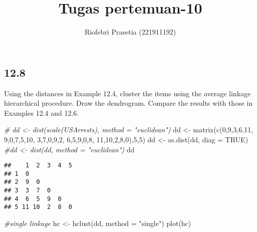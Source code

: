 \documentclass[
]{article}
\title{Tugas pertemuan-10}
\author{Riofebri Prasetia (221911192)}
\date{}
\newenvironment{Shaded}{\begin{snugshade}}{\end{snugshade}}
\newcommand{\AttributeTok}[1]{\textcolor[rgb]{0.77,0.63,0.00}{#1}}
\newcommand{\CommentTok}[1]{\textcolor[rgb]{0.56,0.35,0.01}{\textit{#1}}}
\newcommand{\ConstantTok}[1]{\textcolor[rgb]{0.00,0.00,0.00}{#1}}
\newcommand{\DecValTok}[1]{\textcolor[rgb]{0.00,0.00,0.81}{#1}}
\newcommand{\FunctionTok}[1]{\textcolor[rgb]{0.00,0.00,0.00}{#1}}
\newcommand{\NormalTok}[1]{#1}
\newcommand{\OtherTok}[1]{\textcolor[rgb]{0.56,0.35,0.01}{#1}}
\newcommand{\StringTok}[1]{\textcolor[rgb]{0.31,0.60,0.02}{#1}}
\begin{document}
\maketitle

\hypertarget{section}{%
\subsection{12.8}\label{section}}

Using the distances in Example 12.4, cluster the items using the average
linkage hierarchical procedure. Draw the dendrogram. Compare the results
with those in Examples 12.4 and 12.6.

\begin{Shaded}
\begin{Highlighting}[]
\CommentTok{\# dd \textless{}{-} dist(scale(USArrests), method = "euclidean")}
\NormalTok{dd }\OtherTok{\textless{}{-}} \FunctionTok{matrix}\NormalTok{(}\FunctionTok{c}\NormalTok{(}\DecValTok{0}\NormalTok{,}\DecValTok{9}\NormalTok{,}\DecValTok{3}\NormalTok{,}\DecValTok{6}\NormalTok{,}\DecValTok{11}\NormalTok{,}
               \DecValTok{9}\NormalTok{,}\DecValTok{0}\NormalTok{,}\DecValTok{7}\NormalTok{,}\DecValTok{5}\NormalTok{,}\DecValTok{10}\NormalTok{,}
               \DecValTok{3}\NormalTok{,}\DecValTok{7}\NormalTok{,}\DecValTok{0}\NormalTok{,}\DecValTok{9}\NormalTok{,}\DecValTok{2}\NormalTok{,}
               \DecValTok{6}\NormalTok{,}\DecValTok{5}\NormalTok{,}\DecValTok{9}\NormalTok{,}\DecValTok{0}\NormalTok{,}\DecValTok{8}\NormalTok{,}
               \DecValTok{11}\NormalTok{,}\DecValTok{10}\NormalTok{,}\DecValTok{2}\NormalTok{,}\DecValTok{8}\NormalTok{,}\DecValTok{0}\NormalTok{),}\DecValTok{5}\NormalTok{,}\DecValTok{5}\NormalTok{)}
\NormalTok{dd }\OtherTok{\textless{}{-}} \FunctionTok{as.dist}\NormalTok{(dd, }\AttributeTok{diag =} \ConstantTok{TRUE}\NormalTok{)}
\CommentTok{\#dd \textless{}{-} dist(dd, method = "euclidean")}
\NormalTok{dd}
\end{Highlighting}
\end{Shaded}

\begin{verbatim}
##    1  2  3  4  5
## 1  0            
## 2  9  0         
## 3  3  7  0      
## 4  6  5  9  0   
## 5 11 10  2  8  0
\end{verbatim}

\begin{Shaded}
\begin{Highlighting}[]
\CommentTok{\#single linkage}
\NormalTok{hc }\OtherTok{\textless{}{-}} \FunctionTok{hclust}\NormalTok{(dd, }\AttributeTok{method =} \StringTok{"single"}\NormalTok{)}
\FunctionTok{plot}\NormalTok{(hc)}
\end{Highlighting}
\end{Shaded}
\end{document}
